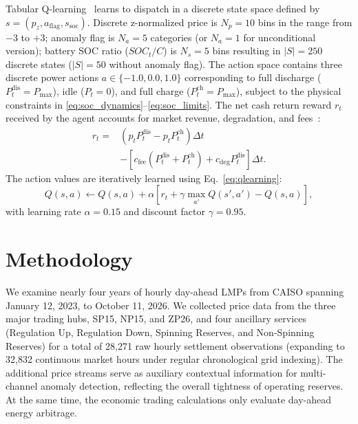 \documentclass[journal]{IEEEtran}
\begin{document}
Tabular Q-learning~\cite{Sutton_RL} learns to dispatch in a discrete state space defined by $s=(p_z, a_{\text{flag}}, s_{\text{soc}})$. Discrete z-normalized price is $N_p=10$ bins in the range from $-3$ to $+3$; anomaly flag is $N_a=5$ categories (or $N_a=1$ for unconditional version); battery SOC ratio ($SOC_t/C$) is $N_s=5$ bins resulting in $|S|=250$ discrete states ($|S|=50$ without anomaly flag). The action space contains three discrete power actions $a \in \{-1.0, 0.0, 1.0\}$ corresponding to full discharge ($P_t^{\text{dis}}=P_{\max}$), idle ($P_t=0$), and full charge ($P_t^{\text{ch}}=P_{\max}$), subject to the physical constraints in \eqref{eq:soc_dynamics}--\eqref{eq:soc_limits}. The net cash return reward $r_t$ received by the agent accounts for market revenue, degradation, and fees~\cite{Xu_BESS_Degradation}:
\begin{align}
r_t ={}& \left( p_t P_t^{\text{dis}} - p_t P_t^{\text{ch}} \right) \Delta t \nonumber \\
&- \left[ c_{\text{fee}} \left( P_t^{\text{dis}} + P_t^{\text{ch}} \right) + c_{\text{deg}} P_t^{\text{dis}} \right] \Delta t.
\label{eq:reward}
\end{align}
The action values are iteratively learned using Eq.~\eqref{eq:qlearning}:
\begin{equation}
Q(s,a) \leftarrow Q(s,a) + \alpha \left[r_t + \gamma \max_{a'} Q(s',a') - Q(s,a)\right],
\label{eq:qlearning}
\end{equation}
with learning rate $\alpha=0.15$ and discount factor $\gamma=0.95$.

\section{Methodology}
\label{sec:methodology}

We examine nearly four years of hourly day-ahead LMPs from CAISO spanning January 12, 2023, to October 11, 2026. We collected price data from the three major trading hubs, SP15, NP15, and ZP26, and four ancillary services (Regulation Up, Regulation Down, Spinning Reserves, and Non-Spinning Reserves) for a total of 28,271 raw hourly settlement observations (expanding to 32,832 continuous market hours under regular chronological grid indexing). The additional price streams serve as auxiliary contextual information for multi-channel anomaly detection, reflecting the overall tightness of operating reserves. At the same time, the economic trading calculations only evaluate day-ahead energy arbitrage. 
\end{document}

